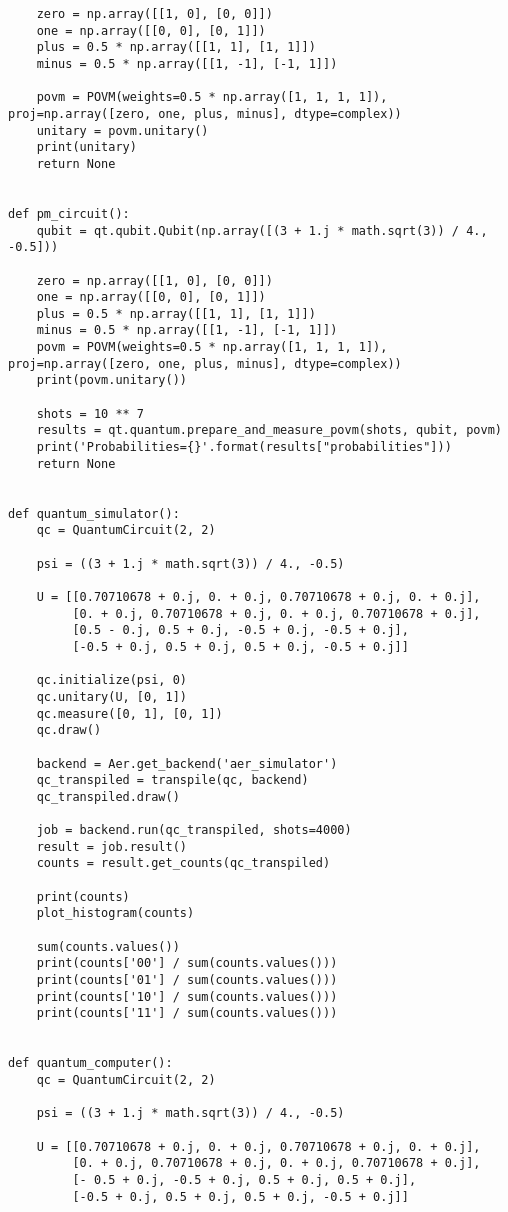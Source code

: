 \begin{verbatim}
    zero = np.array([[1, 0], [0, 0]])
    one = np.array([[0, 0], [0, 1]])
    plus = 0.5 * np.array([[1, 1], [1, 1]])
    minus = 0.5 * np.array([[1, -1], [-1, 1]])

    povm = POVM(weights=0.5 * np.array([1, 1, 1, 1]), proj=np.array([zero, one, plus, minus], dtype=complex))
    unitary = povm.unitary()
    print(unitary)
    return None


def pm_circuit():
    qubit = qt.qubit.Qubit(np.array([(3 + 1.j * math.sqrt(3)) / 4., -0.5]))

    zero = np.array([[1, 0], [0, 0]])
    one = np.array([[0, 0], [0, 1]])
    plus = 0.5 * np.array([[1, 1], [1, 1]])
    minus = 0.5 * np.array([[1, -1], [-1, 1]])
    povm = POVM(weights=0.5 * np.array([1, 1, 1, 1]), proj=np.array([zero, one, plus, minus], dtype=complex))
    print(povm.unitary())

    shots = 10 ** 7
    results = qt.quantum.prepare_and_measure_povm(shots, qubit, povm)
    print('Probabilities={}'.format(results["probabilities"]))
    return None


def quantum_simulator():
    qc = QuantumCircuit(2, 2)

    psi = ((3 + 1.j * math.sqrt(3)) / 4., -0.5)

    U = [[0.70710678 + 0.j, 0. + 0.j, 0.70710678 + 0.j, 0. + 0.j],
         [0. + 0.j, 0.70710678 + 0.j, 0. + 0.j, 0.70710678 + 0.j],
         [0.5 - 0.j, 0.5 + 0.j, -0.5 + 0.j, -0.5 + 0.j],
         [-0.5 + 0.j, 0.5 + 0.j, 0.5 + 0.j, -0.5 + 0.j]]

    qc.initialize(psi, 0)
    qc.unitary(U, [0, 1])
    qc.measure([0, 1], [0, 1])
    qc.draw()

    backend = Aer.get_backend('aer_simulator')
    qc_transpiled = transpile(qc, backend)
    qc_transpiled.draw()

    job = backend.run(qc_transpiled, shots=4000)
    result = job.result()
    counts = result.get_counts(qc_transpiled)

    print(counts)
    plot_histogram(counts)

    sum(counts.values())
    print(counts['00'] / sum(counts.values()))
    print(counts['01'] / sum(counts.values()))
    print(counts['10'] / sum(counts.values()))
    print(counts['11'] / sum(counts.values()))


def quantum_computer():
    qc = QuantumCircuit(2, 2)

    psi = ((3 + 1.j * math.sqrt(3)) / 4., -0.5)

    U = [[0.70710678 + 0.j, 0. + 0.j, 0.70710678 + 0.j, 0. + 0.j],
         [0. + 0.j, 0.70710678 + 0.j, 0. + 0.j, 0.70710678 + 0.j],
         [- 0.5 + 0.j, -0.5 + 0.j, 0.5 + 0.j, 0.5 + 0.j],
         [-0.5 + 0.j, 0.5 + 0.j, 0.5 + 0.j, -0.5 + 0.j]]


\end{verbatim}
